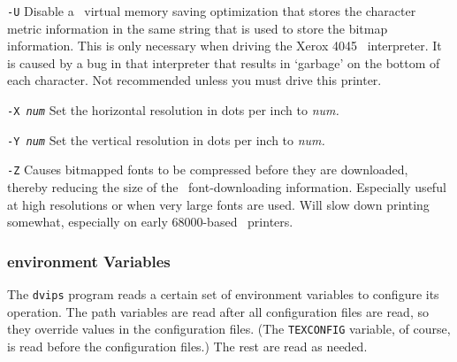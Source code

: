 \begin{list}
\item [\tt -U]
Disable a \PS\ virtual memory saving optimization that stores the
character metric information in the same string that is used to store
the bitmap information.  This is only necessary when driving the Xerox
4045 \PS\ interpreter.  It is caused by a bug in that interpreter
that results in `garbage' on the bottom of each character.  Not
recommended unless you must drive this printer.

\item [\tt -X \em num]
Set the horizontal resolution in dots per inch to {\it num.}

\item [\tt -Y \em num]
Set the vertical resolution in dots per inch to {\it num.}

\item [\tt -Z]
Causes bitmapped fonts to be compressed before they are downloaded,
thereby reducing the size of the \PS\ font-downloading information.
Especially useful at high resolutions or when very large fonts are
used.  Will slow down printing somewhat, especially on early 68000-based
\PS\ printers.
\end{list}




\subsubsection{environment Variables} 
\label{envvar}


The {\tt dvips} program reads a certain set of environment variables to
configure its operation.  The path variables are read after all
configuration files are read, so they override values in the configuration
files.  (The {\tt TEXCONFIG} variable, of course, is read before the
configuration files.)  The rest are read as needed.

